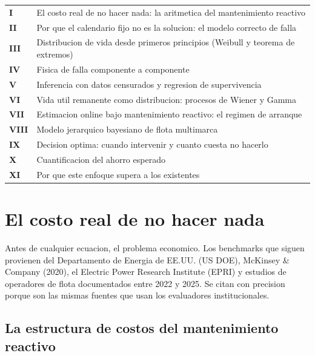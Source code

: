 \documentclass[10.5pt,a4paper]{article}
\begin{document}
\begin{tabular}{@{}p{0.6cm}p{12.8cm}@{}}
  \color{accent}\textbf{I}   & El costo real de no hacer nada: la aritmetica del mantenimiento reactivo \\[4pt]
  \color{accent}\textbf{II}  & Por que el calendario fijo no es la solucion: el modelo correcto de falla \\[4pt]
  \color{accent}\textbf{III} & Distribucion de vida desde primeros principios (Weibull y teorema de extremos) \\[4pt]
  \color{accent}\textbf{IV}  & Fisica de falla componente a componente \\[4pt]
  \color{accent}\textbf{V}   & Inferencia con datos censurados y regresion de supervivencia \\[4pt]
  \color{accent}\textbf{VI}  & Vida util remanente como distribucion: procesos de Wiener y Gamma \\[4pt]
  \color{accent}\textbf{VII} & Estimacion online bajo mantenimiento reactivo: el regimen de arranque \\[4pt]
  \color{accent}\textbf{VIII}& Modelo jerarquico bayesiano de flota multimarca \\[4pt]
  \color{accent}\textbf{IX}  & Decision optima: cuando intervenir y cuanto cuesta no hacerlo \\[4pt]
  \color{accent}\textbf{X}   & Cuantificacion del ahorro esperado \\[4pt]
  \color{accent}\textbf{XI}  & Por que este enfoque supera a los existentes \\
\end{tabular}

\newpage

\section{El costo real de no hacer nada}

Antes de cualquier ecuacion, el problema economico. Los benchmarks que siguen
provienen del Departamento de Energia de EE.UU. (US DOE), McKinsey \& Company (2020),
el Electric Power Research Institute (EPRI) y estudios de operadores de flota
documentados entre 2022 y 2025. Se citan con precision porque son las mismas
fuentes que usan los evaluadores institucionales.

\subsection{La estructura de costos del mantenimiento reactivo}
\end{document}
